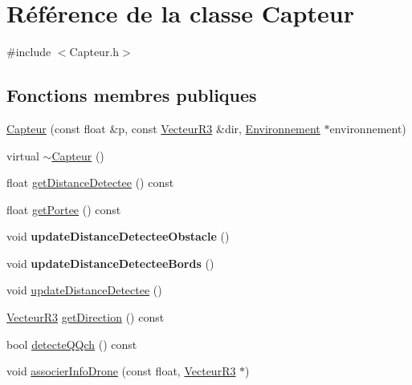\hypertarget{class_capteur}{}\section{Référence de la classe Capteur}
\label{class_capteur}


{\ttfamily \#include $<$Capteur.\+h$>$}

\subsection*{Fonctions membres publiques}
\begin{DoxyCompactItemize}
\item 
\mbox{\hyperlink{class_capteur_a507682442d44b555477ada24146be12f}{Capteur}} (const float \&p, const \mbox{\hyperlink{class_vecteur_r3}{Vecteur\+R3}} \&dir, \mbox{\hyperlink{class_environnement}{Environnement}} $\ast$environnement)
\item 
virtual \mbox{\hyperlink{class_capteur_a2bbfecdceba5e9a13fc7c55cc5f7eae3}{$\sim$\+Capteur}} ()
\item 
float \mbox{\hyperlink{class_capteur_a7b56d66e80c4de6c796b32bc978475e9}{get\+Distance\+Detectee}} () const
\item 
float \mbox{\hyperlink{class_capteur_a6022e941e6ebe7d3472a28802ef0b4c0}{get\+Portee}} () const
\item 
\mbox{\label{class_capteur_ac37318cd8a0199f42321381f6002aa8f}} 
void {\bfseries update\+Distance\+Detectee\+Obstacle} ()
\item 
\mbox{\label{class_capteur_a4abe39065d4aa28aa457f41424a449af}} 
void {\bfseries update\+Distance\+Detectee\+Bords} ()
\item 
void \mbox{\hyperlink{class_capteur_a0e4afe7bdc6e27985564cf69daedca07}{update\+Distance\+Detectee}} ()
\item 
\mbox{\hyperlink{class_vecteur_r3}{Vecteur\+R3}} \mbox{\hyperlink{class_capteur_aa92b7552969206047df939d641cfb802}{get\+Direction}} () const
\item 
bool \mbox{\hyperlink{class_capteur_a0229c6b8fc7838932c53157eb3110b5b}{detecte\+Q\+Qch}} () const
\item 
void \mbox{\hyperlink{class_capteur_aa25dc5f9211e43691bd8351265a2b3b3}{associer\+Info\+Drone}} (const float, \mbox{\hyperlink{class_vecteur_r3}{Vecteur\+R3}} $\ast$)
\end{DoxyCompactItemize}


